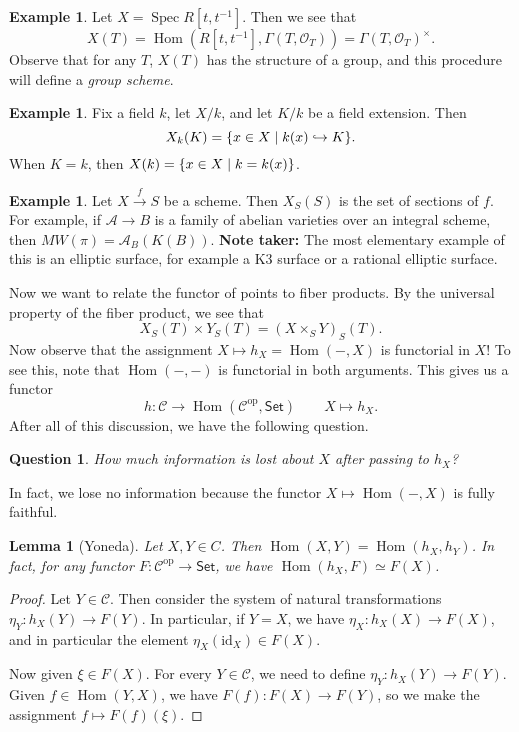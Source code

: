 \documentclass[leqno, openany]{memoir}
\newtheorem{lem}[thm]{Lemma}
\newtheorem{quest}[thm]{Question}
\theoremstyle{definition}
\newtheorem{exm}[thm]{Example}
\theoremstyle{remark}
\theoremstyle{plain}
\theoremstyle{definition}
\theoremstyle{remark}
\newcommand{\mr}[1]{\mathrm{#1}}
\newcommand{\ms}[1]{\mathsf{#1}}
\newcommand{\msc}[1]{\mathscr{#1}}
\renewcommand{\op}{\mathrm{op}}
\DeclareMathOperator{\Hom}{Hom}
\DeclareMathOperator{\Spec}{Spec}
\begin{document}
\begin{exm}
    Let $X = \Spec R[t,t^{-1}]$. Then we see that 
    \[ X(T) = \Hom(R[t,t^{-1}], \Gamma(T, \msc{O}_T)) = {\Gamma(T, \msc{O}_T)}^{\times}. \]
    Observe that for any $T$, $X(T)$ has the structure of a group, and this procedure will define a \textit{group scheme}.
\end{exm}

\begin{exm}
    Fix a field $k$, let $X/k$, and let $K/k$ be a field extension. Then 
    \[ X_k(K) = \qty{x \in X \mid k(x) \hookrightarrow K}. \]
    When $K = k$, then $X(k) = \qty{x \in X \mid k = k(x)}$.
\end{exm}

\begin{exm}
    Let $X \xrightarrow{f} S$ be a scheme. Then $X_S(S)$ is the set of sections of $f$. For example, if $\msc{A} \to B$ is a family of abelian varieties over an integral scheme, then $MW(\pi) = \msc{A}_B(K(B))$. \textbf{Note taker:} The most elementary example of this is an elliptic surface, for example a K3 surface or a rational elliptic surface.
\end{exm}

Now we want to relate the functor of points to fiber products. By the universal property of the fiber product, we see that 
\[ X_S(T) \times Y_S(T) = {(X \times_S Y)}_S(T).\]
Now observe that the assignment $X \mapsto h_X = \Hom(-,X)$ is functorial in $X$! To see this, note that $\Hom(-,-)$ is functorial in both arguments. This gives us a functor
\[ h \colon \msc{C} \to \Hom(\msc{C}^{\op}, \ms{Set}) \qquad X \mapsto h_X. \]
After all of this discussion, we have the following question.

\begin{quest}
    How much information is lost about $X$ after passing to $h_X$?
\end{quest}
In fact, we lose no information because the functor $X \mapsto \Hom(-,X)$ is fully faithful.
\begin{lem}[Yoneda]
    Let $X,Y \in C$. Then $\Hom(X,Y) = \Hom(h_X, h_Y)$. In fact, for any functor $F \colon \msc{C}^{\op} \to \ms{Set}$, we have $\Hom(h_X, F) \simeq F(X)$.
\end{lem}

\begin{proof}
    Let $Y \in \msc{C}$. Then consider the system of natural transformations $\eta_Y \colon h_X(Y) \to F(Y)$. In particular, if $Y = X$, we have $\eta_X \colon h_X(X) \to F(X)$, and in particular the element $\eta_X(\mr{id}_X) \in F(X)$.

    Now given $\xi \in F(X)$. For every $Y \in \msc{C}$, we need to define $\eta_Y \colon h_X(Y) \to F(Y)$. Given $f \in \Hom(Y,X)$, we have $F(f) \colon F(X) \to F(Y)$, so we make the assignment $f \mapsto F(f)(\xi)$.
\end{proof}
\end{document}

